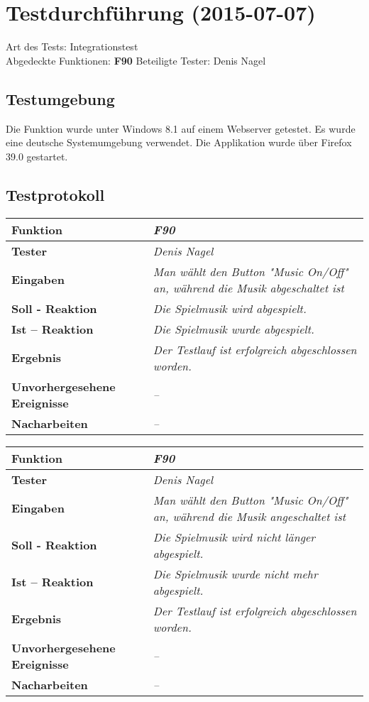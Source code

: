 
\chapter{Testdurchführung (2015-07-07)}

Art des Tests: Integrationstest\\
Abgedeckte Funktionen: \textbf{F90}
Beteiligte Tester: Denis Nagel\\

\section{Testumgebung}

Die Funktion wurde unter Windows 8.1 auf einem Webserver  getestet. Es wurde eine deutsche Systemumgebung verwendet. Die Applikation wurde über Firefox 39.0 gestartet.

\section{Testprotokoll}

\begin{longtable}{|p{4cm}|p{11cm}|}
\hline
\textbf{Funktion} & \textit{\textbf{F90}} \\
\hline
\textbf{Tester} & \textit{Denis Nagel} \\
\hline
\textbf{Eingaben} & \textit{Man wählt den Button "Music On/Off" an, während die Musik abgeschaltet ist} \\
\hline
\textbf{Soll - Reaktion} & \textit{Die Spielmusik wird abgespielt.} \\
\hline
\textbf{Ist -- Reaktion} & \textit{Die Spielmusik wurde abgespielt.} \\
\hline
\textbf{Ergebnis} & \textit{Der Testlauf ist erfolgreich abgeschlossen worden.} \\
\hline
\textbf{Unvorhergesehene Ereignisse} & \textit{--} \\
\hline
\textbf{Nacharbeiten } & \textit{--} \\
\hline
\end{longtable}

\begin{longtable}{|p{4cm}|p{11cm}|}
\hline
\textbf{Funktion} & \textit{\textbf{F90}} \\
\hline
\textbf{Tester} & \textit{Denis Nagel} \\
\hline
\textbf{Eingaben} & \textit{Man wählt den Button "Music On/Off" an, während die Musik angeschaltet ist} \\
\hline
\textbf{Soll - Reaktion} & \textit{Die Spielmusik wird nicht länger abgespielt.} \\
\hline
\textbf{Ist -- Reaktion} & \textit{Die Spielmusik wurde nicht mehr abgespielt.} \\
\hline
\textbf{Ergebnis} & \textit{Der Testlauf ist erfolgreich abgeschlossen worden.} \\
\hline
\textbf{Unvorhergesehene Ereignisse} &\textit{--} \\
\hline
\textbf{Nacharbeiten } & \textit{--} \\
\hline
\end{longtable}

